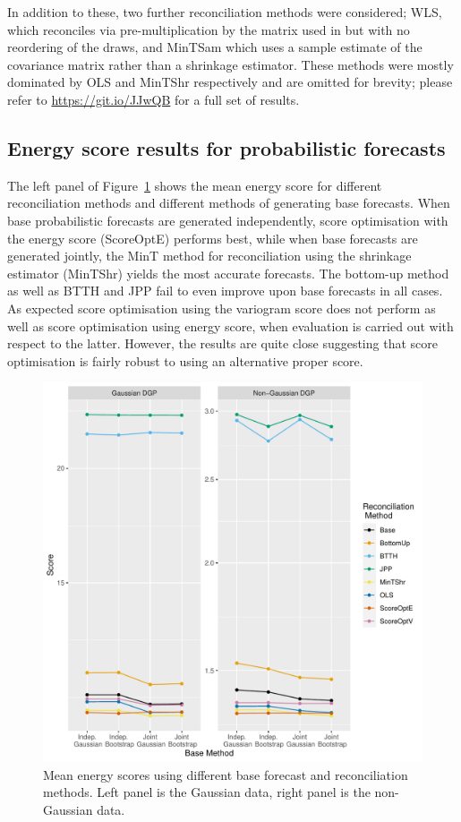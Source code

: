 \documentclass[a4paper,12pt]{article}
\theoremstyle{definition}
\begin{document}
In addition to these, two further reconciliation methods were considered; WLS, which reconciles via pre-multiplication by the matrix used in \cite{JeoEtAl2019} but with no reordering of the draws, and MinTSam which uses a sample estimate of the covariance matrix rather than a shrinkage estimator. These methods were mostly dominated by OLS and MinTShr respectively and are omitted for brevity; please refer to \url{https://git.io/JJwQB} for a full set of results.

\subsection{Energy score results for probabilistic forecasts}\label{sec:SimAnalysticalResults}

The left panel of Figure~\ref{fig:meanscore_e} shows the mean energy score for different reconciliation methods and different methods of generating base forecasts. When base probabilistic forecasts are generated independently, score optimisation with the energy score (ScoreOptE) performs best, while when base forecasts are generated jointly, the MinT method for reconciliation using the shrinkage estimator (MinTShr) yields the most accurate forecasts. The bottom-up method as well as BTTH and JPP fail to even improve upon base forecasts in all cases. As expected score optimisation using the variogram score does not perform as well as score optimisation using energy score, when evaluation is carried out with respect to the latter. However, the results are quite close suggesting that score optimisation is fairly robust to using an alternative proper score.

\begin{figure}[!htb]
  \centering
  \includegraphics[height=0.45\textheight]{energy_meanscore}
  \caption{Mean energy scores using different base forecast and reconciliation methods. Left panel is the Gaussian data, right panel is the non-Gaussian data.}
  \label{fig:meanscore_e}
\end{figure}
\end{document}
